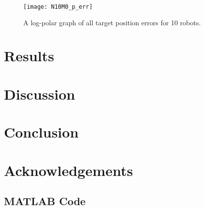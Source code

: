 \documentclass[11pt]{article}
\begin{document}
\begin{figure}
	\centering
	\texttt{[image: N10M0\_p\_err]}
	\caption{A log-polar graph of all target position errors for 10 robots.}
	\label{fig:n10m0-p-err}
\end{figure}

\section{Results}

\section{Discussion}

\section{Conclusion}

\section{Acknowledgements}

\begin{appendices}

\section{MATLAB Code}

\end{appendices}
\end{document}

